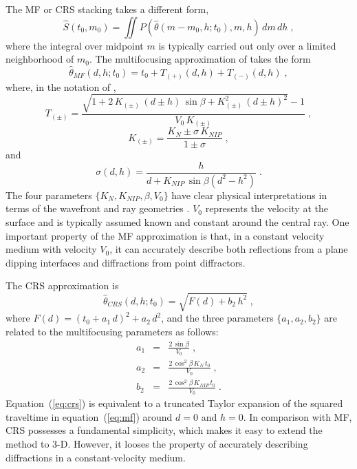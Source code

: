 The MF or CRS stacking takes a different form,
\begin{equation}
\label{eq:stack2}
\widehat{S}(t_0,m_0) = \iint P\left(\widehat{\theta}(m-m_0,h;t_0),m,h\right)\,d m\,d h\;,
\end{equation}
where the integral over midpoint $m$ is typically carried out only over a limited
neighborhood of $m_0$. The multifocusing approximation of
\cite{gelchinsky} takes the form 
\begin{equation}
\label{eq:mf}
\widehat{\theta}_{MF}(d,h;t_0) = t_0 + T_{(+)}(d,h) + T_{(-)}(d,h)\;,
\end{equation}
where, in the notation of \cite{tygel2},
\begin{equation}
\label{eq:tpm}
T_{(\pm)} = \frac{\sqrt{1+2\,K_{(\pm)}\,(d \pm h)\,\sin{\beta} + K_{(\pm)}^2\,(d \pm h)^2}-1}{V_0\,K_{(\pm)}}\;, 
\end{equation}
\begin{equation}
\label{eq:kpm}
K_{(\pm)} = \frac{K_N \pm \sigma\,K_{NIP}}{1 \pm \sigma}\;, 
\end{equation}
and 
\begin{equation}
\label{eq:sigma}
\sigma(d,h) = \frac{h}{d + K_{NIP}\,\sin{\beta}(d^2-h^2)}\;.
\end{equation}
The four parameters $\{K_N,K_{NIP},\beta,V_0\}$ have clear physical
interpretations in terms of the wavefront and ray geometries
\cite[]{gelchinsky}. $V_0$ represents the velocity at the surface and is typically 
assumed known and constant around the central ray. One important property of the MF 
approximation is that, in a constant velocity medium with velocity $V_0$, it can 
accurately describe both reflections from a plane dipping interfaces and diffractions from point diffractors.


The CRS approximation \cite[]{jager} is
\begin{equation}
\label{eq:crs}
\widehat{\theta}_{CRS}(d,h;t_0) = \sqrt{F(d) + b_2\,h^2}\;,
\end{equation}
where $F(d) = (t_0 + a_1\,d)^2 + a_2\,d^2$, and the three parameters
$\{a_1,a_2,b_2\}$ are related to the multifocusing parameters as
follows:
\begin{eqnarray}
\label{eq:a1}
a_1 & = & \frac{2\,\sin{\beta}}{V_0}\;, \\
\label{eq:a2}
a_2 & = & \frac{2\,\cos^2{\beta}\,K_N\,t_0}{V_0}\;, \\
\label{eq:b2}
b_2 & = & \frac{2\,\cos^2{\beta}\,K_{NIP}\,t_0}{V_0}\;.
\end{eqnarray}
Equation~(\ref{eq:crs}) is equivalent to a truncated Taylor expansion
of the squared traveltime in equation~(\ref{eq:mf}) around $d=0$ and
$h=0$. In comparison with MF, CRS possesses a fundamental
simplicity, which makes it easy to extend the method to 3-D. However,
it looses the property of accurately describing diffractions in a
constant-velocity medium.

